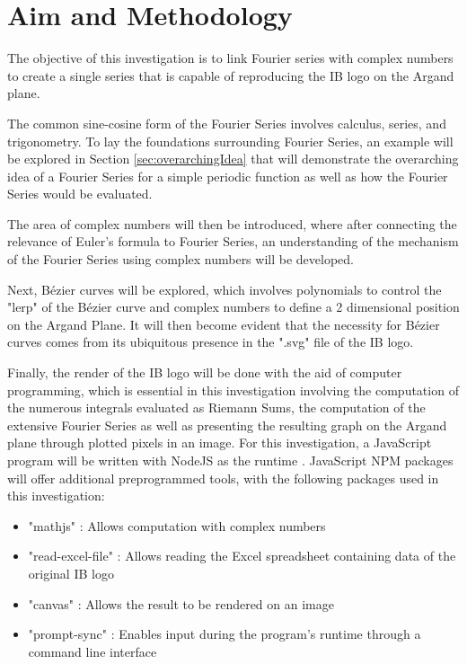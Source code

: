 \documentclass[letterpaper, 12pt]{article}
\begin{document}
\section{Aim and Methodology}

The objective of this investigation is to link Fourier series with
complex numbers to create a single series that is capable
of reproducing the IB logo on the Argand plane.

The common sine-cosine form of the Fourier Series
involves calculus, series, and trigonometry.
To lay the foundations surrounding Fourier Series,
an example will be explored in Section \ref*{sec:overarchingIdea}
that will demonstrate the overarching idea of a Fourier Series
for a simple periodic function as well as how
the Fourier Series would be evaluated.

The area of complex numbers will then be introduced, where
after connecting the relevance of Euler's formula
to Fourier Series, an understanding of the mechanism of the Fourier Series
using complex numbers will be developed.

Next, Bézier curves will be explored, which involves
polynomials to control the "lerp" of the Bézier curve and
complex numbers to define a 2 dimensional position on the Argand
Plane. It will then become evident that the necessity
for Bézier curves comes from its ubiquitous presence
in the ".svg" file of the IB logo.

Finally, the render of the IB logo will be
done with the aid of computer programming, which is essential in
this investigation involving the computation of the numerous integrals evaluated as Riemann Sums,
the computation of the extensive Fourier Series
as well as presenting the resulting graph on the Argand plane
through plotted pixels in an image. For this investigation,
a JavaScript program will be written with NodeJS as the runtime \cite{NodeJs}.
JavaScript NPM packages will offer additional preprogrammed tools,
with the following packages used in this investigation:

\begin{itemize}
    \item "mathjs" \cite{dejongMathjs}: Allows computation with complex numbers
    \item "read-excel-file" \cite{kuchumovReadexcelfile}: Allows reading the Excel spreadsheet containing data of the original IB logo
    \item "canvas" \cite{automatticCanvas}: Allows the result to be rendered on an image
    \item "prompt-sync" \cite{fragomeniPromptsync}: Enables input during the program's runtime through a command line interface
\end{itemize}
\end{document}
